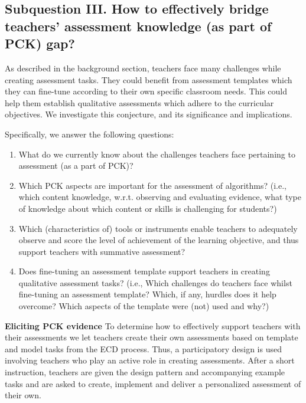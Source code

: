 \subsection{Subquestion III. How to effectively bridge teachers' assessment knowledge (as part of PCK) gap?}%


As described in the background section, teachers face many challenges while creating assessment tasks. They could benefit from assessment templates which they can fine-tune according to their own specific classroom needs. This could help them establish qualitative assessments which adhere to the curricular objectives. We investigate this conjecture, and its significance and implications.

Specifically, we answer the following questions:
\begin{enumerate}
\item What do we currently know about the challenges teachers face pertaining to assessment (as a part of PCK)?
\item Which PCK aspects are important for the assessment of algorithms? (i.e., which content knowledge, w.r.t. observing and evaluating evidence, what type of knowledge about which content or skills is challenging for students?)
\item Which (characteristics of) tools or instruments enable teachers to adequately observe and score the level of achievement of the learning objective, and thus support teachers with summative assessment?
\item Does fine-tuning an assessment template support teachers in creating qualitative assessment tasks? (i.e., Which challenges do teachers face whilst fine-tuning an assessment template? Which, if any, hurdles does it help overcome? Which aspects of the template were (not) used and why?)
\end{enumerate}



\noindent\textbf{Eliciting PCK evidence}\newline
To determine how to effectively support teachers with their assessments we let teachers create their own assessments based on template and model tasks from the ECD process. Thus, a participatory design is used involving teachers who play an active role in creating assessments. After a short instruction, teachers are given the design pattern and accompanying example tasks and are asked to create, implement and deliver a personalized assessment of their own.

